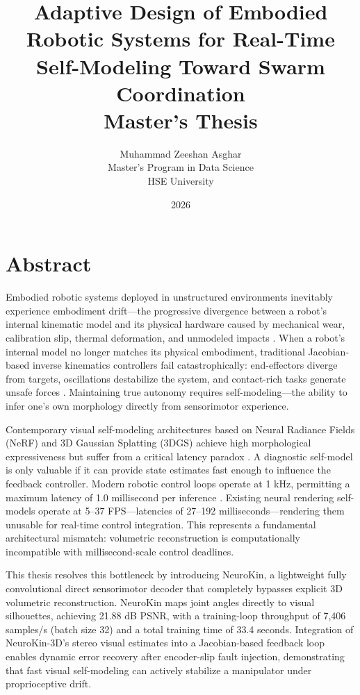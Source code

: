 \documentclass[12pt,a4paper,oneside]{report}
\title{
    \vspace{2cm}
    \textbf{\Large Adaptive Design of Embodied Robotic Systems for Real-Time Self-Modeling Toward Swarm Coordination} \\
    \vspace{1cm}
    \large Master's Thesis
}
\author{
    Muhammad Zeeshan Asghar \\
    Master's Program in Data Science \\
    HSE University
}
\date{\vspace{1cm} 2026}
\begin{document}

\clearpage

\chapter*{Abstract}

Embodied robotic systems deployed in unstructured environments inevitably experience embodiment drift—the progressive divergence between a robot's internal kinematic model and its physical hardware caused by mechanical wear, calibration slip, thermal deformation, and unmodeled impacts \cite{bongard2006resilient, cully2015robots}. When a robot's internal model no longer matches its physical embodiment, traditional Jacobian-based inverse kinematics controllers fail catastrophically: end-effectors diverge from targets, oscillations destabilize the system, and contact-rich tasks generate unsafe forces \cite{kwiatkowski2019task, chen2022full}. Maintaining true autonomy requires self-modeling—the ability to infer one's own morphology directly from sensorimotor experience.

Contemporary visual self-modeling architectures based on Neural Radiance Fields (NeRF) and 3D Gaussian Splatting (3DGS) achieve high morphological expressiveness but suffer from a critical latency paradox \cite{hu2024teaching, hu2025learning}. A diagnostic self-model is only valuable if it can provide state estimates fast enough to influence the feedback controller. Modern robotic control loops operate at 1 kHz, permitting a maximum latency of 1.0 millisecond per inference \cite{siciliano2009robotics}. Existing neural rendering self-models operate at 5–37 FPS—latencies of 27–192 milliseconds—rendering them unusable for real-time control integration. This represents a fundamental architectural mismatch: volumetric reconstruction is computationally incompatible with millisecond-scale control deadlines.

This thesis resolves this bottleneck by introducing NeuroKin, a lightweight fully convolutional direct sensorimotor decoder that completely bypasses explicit 3D volumetric reconstruction. NeuroKin maps joint angles directly to visual silhouettes, achieving 21.88 dB PSNR, with a training-loop throughput of 7,406 samples/s (batch size 32) and a total training time of 33.4 seconds. Integration of NeuroKin-3D's stereo visual estimates into a Jacobian-based feedback loop enables dynamic error recovery after encoder-slip fault injection, demonstrating that fast visual self-modeling can actively stabilize a manipulator under proprioceptive drift.
\end{document}
